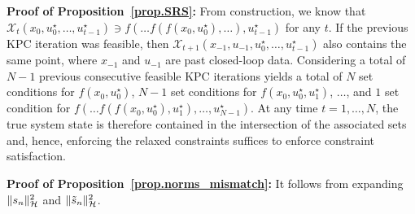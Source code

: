 \begin{my_proof}
	\textbf{Proof of Proposition~\ref{prop.SRS}:}
	From construction, we know that $\mathcal{X}_t (x_0,u_0^\star,\dots,u_{t-1}^\star) \ni f(\dots f(f(x_0,u_0^\star),\dots),u_{t-1}^\star)$ for any $t$. If the previous KPC iteration was feasible, then  $\mathcal{X}_{t+1} (x_{-1},u_{-1},u_0^\star,\dots,u_{t-1}^\star)$ also contains the same point, where $x_{-1}$ and $u_{-1}$ are past closed-loop data. Considering a total of $N-1$ previous consecutive feasible KPC iterations yields a total of $N$ set conditions for $f(x_0,u_0^\star)$, $N-1$ set conditions for $f(x_0,u_0^\star,u_1^\star)$, $\dots$, and $1$ set condition for $f(\dots f(f(x_0,u_0^\star),u_1^\star),\dots,u_{N-1}^\star)$. At any time $t=1,\dots,N$, the true system state is therefore contained in the intersection of the associated sets and, hence, enforcing the relaxed constraints suffices to enforce constraint satisfaction.
\end{my_proof} 

\begin{my_proof}
	\textbf{Proof of Proposition~\ref{prop.norms_mismatch}:}
	It follows from expanding $\Vert s_n \Vert_{\mathcal{H}}^2$ and $\Vert \tilde s_n \Vert_{\mathcal{H}}^2$.
\end{my_proof}